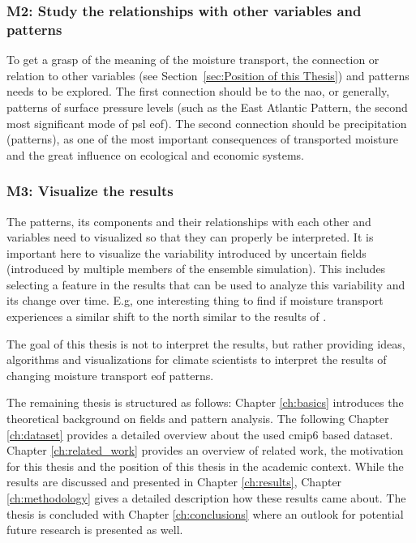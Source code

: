 \subsubsection{M2: Study the relationships with other variables and patterns}

To get a grasp of the meaning of the moisture transport, the connection or relation to other variables (see Section~\ref{sec:Position of this Thesis}) and patterns needs to be explored. 
The first connection should be to the \ac{nao}, or generally, patterns of surface pressure levels (such as the East Atlantic Pattern, the second most significant mode of \ac{psl} \ac{eof}). 
The second connection should be precipitation (patterns), as one of the most important consequences of transported moisture and the great influence on ecological and economic systems. 


\subsubsection{M3: Visualize the results}

The patterns, its components and their relationships with each other and variables need to visualized so that they can properly be interpreted. 
It is important here to visualize the variability introduced by uncertain fields (introduced by multiple members of the ensemble simulation).  
This includes selecting a feature in the results that can be used to analyze this variability and its change over time. 
E.g, one interesting thing to find if moisture transport experiences a similar shift to the north similar to the results of .

The goal of this thesis is not to interpret the results, but rather providing ideas, algorithms and visualizations for climate scientists to interpret the results of changing moisture transport \ac{eof} patterns. 




\vspace{.3cm}
The remaining thesis is structured as follows: Chapter \ref{ch:basics} introduces the theoretical background on fields and pattern analysis. 
The following Chapter \ref{ch:dataset} provides a detailed overview about the used \ac{cmip}6 based dataset. 
Chapter \ref{ch:related_work} provides an overview of related work, the motivation for this thesis and the position of this thesis in the academic context. 
While the results are discussed and presented in Chapter \ref{ch:results}, Chapter \ref{ch:methodology} gives a detailed description how these results came about. 
The thesis is concluded with Chapter \ref{ch:conclusions} where an outlook for potential future research is presented as well. 

